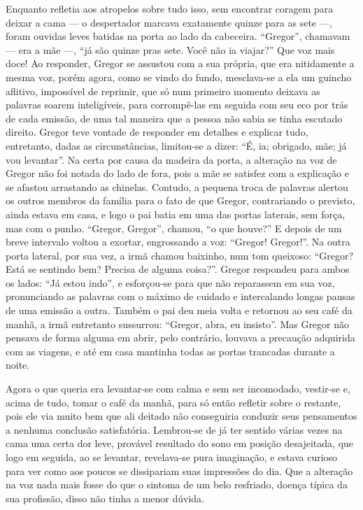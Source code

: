 Enquanto refletia aos atropelos sobre tudo isso, sem encontrar coragem
para deixar a cama --- o despertador marcava exatamente quinze para as sete
---, foram ouvidas leves batidas na porta ao lado da cabeceira. “Gregor”,
chamavam --- era a mãe ---, “já são quinze pras sete. Você não ia
viajar?” Que
voz mais doce! Ao responder, Gregor se assustou com a sua própria, que era
nitidamente a mesma voz, porém agora, como se vindo do fundo, mesclava-se
a ela um guincho aflitivo, impossível de reprimir, que só num primeiro
momento deixava as palavras soarem inteligíveis, para corrompê-las em
seguida com seu eco por trás de cada emissão, de uma tal maneira que a
pessoa não sabia se tinha escutado direito. Gregor teve vontade de
responder em detalhes e explicar tudo, entretanto, dadas as
circunstâncias, limitou-se a dizer: “É, ia; obrigado, mãe; já vou
levantar”. Na certa por causa da madeira da porta, a alteração na voz de
Gregor não foi notada do lado de fora, pois a mãe se satisfez com a
explicação e se afastou arrastando as chinelas. Contudo, a pequena troca
de palavras alertou os outros membros da família para o fato de que
Gregor, contrariando o previsto, ainda estava em casa, e logo o pai batia
em uma das portas laterais, sem força, mas com o punho. “Gregor, Gregor”,
chamou, “o que houve?” E depois de um breve intervalo voltou a exortar,
engrossando a voz: “Gregor! Gregor!”. Na outra porta lateral, por sua vez,
a irmã chamou baixinho, num tom queixoso: “Gregor? Está se sentindo bem?
Precisa de alguma coisa?”. Gregor respondeu para ambos os lados: “Já estou
indo”, e esforçou-se para que não reparassem em sua voz, pronunciando as
palavras com o máximo de cuidado e intercalando longas pausas de uma
emissão a outra. Também o pai deu meia volta e retornou ao seu café da
manhã, a irmã entretanto sussurrou: “Gregor, abra, eu insisto”. Mas Gregor
não pensava de forma alguma em abrir, pelo contrário, louvava a precaução
adquirida com as viagens, e até em casa mantinha todas as portas trancadas
durante a noite.

Agora o que queria era levantar-se com calma e sem ser incomodado,
vestir-se e, acima de tudo, tomar o café da manhã, para só então refletir
sobre o restante, pois ele via muito bem que ali deitado não conseguiria
conduzir seus pensamentos a nenhuma conclusão satisfatória. Lembrou-se de
já ter sentido várias vezes na cama uma certa dor leve, provável resultado
do sono em posição desajeitada, que logo em seguida, ao se levantar,
revelava-se pura imaginação, e estava curioso para ver como aos poucos se
dissipariam suas impressões do dia. Que a alteração na voz nada mais fosse
do que o sintoma de um belo resfriado, doença típica da sua profissão,
disso não tinha a menor dúvida.

